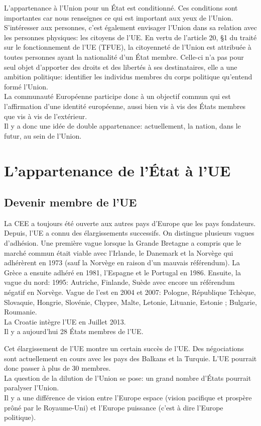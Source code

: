 \documentclass[12pt, a4paper, openany]{book}
\begin{document}
L'appartenance à l'Union pour un État est conditionné. Ces conditions sont importantes car nous renseignes ce qui est important aux yeux de l'Union. S'intéresser aux personnes, c'est également envisager l'Union dans sa relation avec les personnes physiques: les citoyens de l'UE. En vertu de l'article 20, §1 du traité sur le fonctionnement de l'UE (TFUE), la citoyenneté de l'Union est attribuée à toutes personnes ayant la nationalité d'un État membre. Celle-ci n'a pas pour seul objet d'apporter des droits et des libertés à ses destinataires, elle a une ambition politique: identifier les individus membres du corps politique qu'entend formé l'Union. \\
La communauté Européenne participe donc à un objectif commun qui est l'affirmation d'une identité européenne, aussi bien vis à vis des États membres que vis à vis de l'extérieur. \\
Il y a donc une idée de double appartenance: actuellement, la nation, dans le futur, au sein de l'Union.


\section{L'appartenance de l'État à l'UE}

\subsection{Devenir membre de l'UE}

La CEE a toujours été ouverte aux autres pays d'Europe que les pays fondateurs. Depuis, l'UE a connu des élargissements successifs. On distingue plusieurs vagues d'adhésion. Une première vague lorsque la Grande Bretagne a compris que le marché commun était viable avec l'Irlande, le Danemark et la Norvège qui adhérèrent en 1973 (sauf la Norvège en raison d'un mauvais référendum). La Grèce a ensuite adhéré en 1981, l'Espagne et le Portugal en 1986. Ensuite, la vague du nord: 1995: Autriche, Finlande, Suède avec encore un référendum négatif en Norvège. Vague de l'est en 2004 et 2007: Pologne, République Tchèque, Slovaquie, Hongrie, Slovénie, Chypre, Malte, Letonie, Lituanie, Estonie ; Bulgarie, Roumanie. \\
La Croatie intègre l'UE en Juillet 2013. \\
Il y a aujourd'hui 28 États membres de l'UE. 


Cet élargissement de l'UE montre un certain succès de l'UE. Des négociations sont actuellement en cours avec les pays des Balkans et la Turquie. L'UE pourrait donc passer à plus de 30 membres. \\
La question de la dilution de l'Union se pose: un grand nombre d'États pourrait paralyser l'Union. \\
Il y a une différence de vision entre l'Europe espace (vision pacifique et prospère prôné par le Royaume-Uni) et l'Europe puissance (c'est à dire l'Europe politique).  
\end{document}
